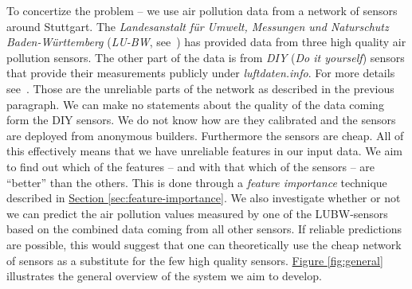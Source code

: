 \documentclass[12pt,a4paper,twoside]{scrartcl}
\numberwithin{equation}{section}
\newcommand{\reffig}[1]{\hyperref[#1]{Figure \ref*{#1}}}
\newcommand{\refsec}[1]{\hyperref[#1]{Section \ref*{#1}}}
\begin{document}
To concertize the problem -- we use air pollution data from a network of sensors around Stuttgart. The \emph{Landesanstalt für Umwelt, Messungen und Naturschutz Baden-Württemberg} (\emph{LU-BW}, see~\cite{lubw}) has provided data from three high quality air pollution sensors. The other part of the data is from \emph{DIY} (\emph{Do it yourself}) sensors that provide their measurements publicly under \emph{luftdaten.info}. For more details see~\cite{luftdaten}. Those are the unreliable parts of the network as described in the previous paragraph. We can make no statements about the quality of the data coming form the DIY sensors. We do not know how are they calibrated and the sensors are deployed from anonymous builders. Furthermore the sensors are cheap. All of this effectively means that we have unreliable features in our input data. We aim to find out which of the features -- and with that which of the sensors -- are ``better'' than the others. This is done through a \emph{feature importance} technique described in \refsec{sec:feature-importance}. We also investigate whether or not we can predict the air pollution values measured by one of the LUBW-sensors based on the combined data coming from all other sensors. If reliable predictions are possible, this would suggest that one can theoretically use the cheap network of sensors as a substitute for the few high quality sensors. \reffig{fig:general} illustrates  the general overview of the system we aim to develop.
\vfill
\end{document}
